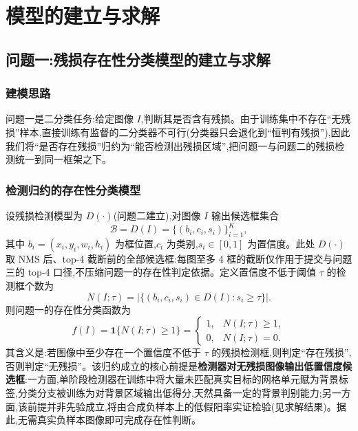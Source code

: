 \section{模型的建立与求解}

\subsection{问题一:残损存在性分类模型的建立与求解}

\subsubsection{建模思路}

问题一是二分类任务:给定图像 $I$,判断其是否含有残损。由于训练集中不存在“无残损”样本,直接训练有监督的二分类器不可行(分类器只会退化到“恒判有残损”),因此我们将“是否存在残损”归约为“能否检测出残损区域”,把问题一与问题二的残损检测统一到同一框架之下。

\subsubsection{检测归约的存在性分类模型}

设残损检测模型为 $D(\cdot)$(问题二建立),对图像 $I$ 输出候选框集合
\[
\mathcal{B}=D(I)=\{(b_i,c_i,s_i)\}_{i=1}^{K},
\]
其中 $b_i=(x_i,y_i,w_i,h_i)$ 为框位置,$c_i$ 为类别,$s_i\in[0,1]$ 为置信度。此处 $D(\cdot)$ 取 NMS 后、top-4 截断前的全部候选框:每图至多 4 框的截断仅作用于提交与问题三的 top-4 口径,不压缩问题一的存在性判定依据。定义置信度不低于阈值 $\tau$ 的检测框个数为
\[
N(I;\tau)=\bigl|\{(b_i,c_i,s_i)\in D(I):s_i\ge\tau\}\bigr|.
\]
则问题一的存在性分类函数为
\[
f(I)=\mathbf{1}\{N(I;\tau)\ge 1\}
=\begin{cases}1, & N(I;\tau)\ge 1,\\ 0, & N(I;\tau)=0.\end{cases}
\]
其含义是:若图像中至少存在一个置信度不低于 $\tau$ 的残损检测框,则判定“存在残损”,否则判定“无残损”。该归约成立的核心前提是\textbf{检测器对无残损图像输出低置信度候选框}:一方面,单阶段检测器在训练中将大量未匹配真实目标的网格单元赋为背景标签,分类分支被训练为对背景区域输出低得分,天然具备一定的背景判别能力;另一方面,该前提并非先验成立,将由合成负样本上的低假阳率实证检验(见求解结果)。据此,无需真实负样本图像即可完成存在性判断。

